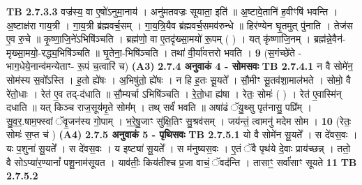\documentclass[17pt]{extarticle}
\begin{document}
{                  \newline
                                \textbf{ TB 2.7.3.3} \newline
                  वज्र॑स्य॒ वा ए॒षो॑ऽनुमा॒नाय॑ । अनु॑मतवज्रः सूयाता॒ इति॑ ॥ अ॒ष्टावे॒तानि॑ ह॒वीꣳषि॑ भवन्ति । अ॒ष्टाक्ष॑रा गाय॒त्री । गा॒य॒त्री ब्र॑ह्मवर्च॒सम् । गा॒य॒त्रि॒यैव ब्र॑ह्मवर्च॒समव॑रुन्धे ॥ हिर॑ण्येन घृ॒तमुत् पु॑नाति । तेज॑स ए॒व रु॒चे ॥ कृ॒ष्णा॒जि॒ने॑ऽभिषि॑ञ्चति । ब्रह्म॑णो॒ वा ए॒तदृ॑ख्सा॒मयो॑ रू॒पम् ( ) । यत् कृ॑ष्णाजि॒नम् । ब्रह्म॑न्ने॒वैन॑-मृख्सा॒मयो॒-रद्ध्य॒भिषि॑ञ्चति ॥ घृ॒तेना॒-भिषि॑ञ्चति । तथा॑ वी॒र्या॑वत्तरो भवति । \textbf{ 9} \newline
                  \newline
                                    (स॒गंच्छे॑ते - भाग॒धेये॒नान्व॑मन्येताꣳ- रू॒पं च॒त्वारि॑ च) \textbf{(A3)} \newline \newline
                \textbf{ 2.7.4      अनुवाकं   4 - सोमसवः} \newline
                                \textbf{ TB 2.7.4.1} \newline
                  न वै सोमे॑न॒ सोम॑स्य स॒वो᳚ऽस्ति । ह॒तो ह्ये॑षः । अ॒भिषु॑तो॒ ह्ये॑षः । न हि ह॒तः सू॒यते᳚ । सौ॒मीꣳ सू॒तव॑शा॒माल॑भते । सोमो॒ वै रे॑तो॒धाः । रेत॑ ए॒व तद्-द॑धाति ॥ सौ॒म्यर्चा ऽभिषि॑ञ्चति । रे॒तो॒धा ह्य॑षा । रेतः॒ सोमः॑ ( ) । रेत॑ ए॒वास्मि॑न् दधाति ॥ यत् किञ्च राज॒सूय॑मृ॒ते सोम᳚म् । तथ् सर्वं॑ भवति ॥ अषा॑ढं ॅयु॒थ्सु पृत॑नासु॒ पप्रि᳚म् । सु॒व॒र॒.षाम॒फ्स्वां ॅवृ॒जन॑स्य गो॒पाम् । भ॒रे॒षु॒जाꣳ सु॑क्षि॒तिꣳ सु॒श्रव॑सम् । जय॑न्तं॒ त्वामनु॑ मदेम सोम । \textbf{ 10} \newline
                  \newline
                                    (रेतः॒ सोमः॑ स॒प्त च॑ ) \textbf{(A4)} \newline \newline
                \textbf{ 2.7.5      अनुवाकं   5 - पृथिसवः} \newline
                                \textbf{ TB 2.7.5.1} \newline
                  यो वै सोमे॑न सू॒यते᳚ । स दे॑वस॒वः । यः प॒शुना॑ सू॒यते᳚ । स दे॑वस॒वः । य इष्ट्या॑ सू॒यते᳚ । स म॑नुष्यस॒वः । ए॒तं ॅवै पृथ॑ये दे॒वाः प्राय॑च्छन्न् । ततो॒ वै सोऽप्या॑र॒ण्यानां᳚ पशू॒नाम॑सूयत । याव॑तीः॒ किय॑तीश्च प्र॒जा वाचं॒ ॅवद॑न्ति । तासाꣳ॒॒ सर्वा॑साꣳ सूयते \textbf{ 11} \newline
                  \newline
                                \textbf{ TB 2.7.5.2} \newline
}
\end{document}

